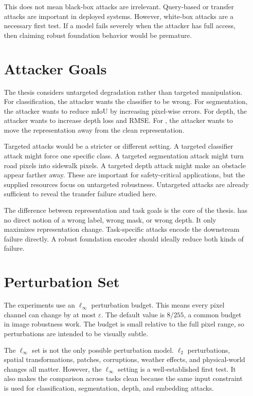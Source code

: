 This does not mean black-box attacks are irrelevant. Query-based or transfer attacks are important in deployed systems. However, white-box attacks are a necessary first test. If a model fails severely when the attacker has full access, then claiming robust foundation behavior would be premature.

\section{Attacker Goals}

The thesis considers untargeted degradation rather than targeted manipulation. For classification, the attacker wants the classifier to be wrong. For segmentation, the attacker wants to reduce mIoU by increasing pixel-wise errors. For depth, the attacker wants to increase depth loss and RMSE. For \EmbedAttack, the attacker wants to move the representation away from the clean representation.

Targeted attacks would be a stricter or different setting. A targeted classifier attack might force one specific class. A targeted segmentation attack might turn road pixels into sidewalk pixels. A targeted depth attack might make an obstacle appear farther away. These are important for safety-critical applications, but the supplied resources focus on untargeted robustness. Untargeted attacks are already sufficient to reveal the transfer failure studied here.

The difference between representation and task goals is the core of the thesis. \EmbedAttack has no direct notion of a wrong label, wrong mask, or wrong depth. It only maximizes representation change. Task-specific attacks encode the downstream failure directly. A robust foundation encoder should ideally reduce both kinds of failure.

\section{Perturbation Set}

The experiments use an $\ell_\infty$ perturbation budget. This means every pixel channel can change by at most $\varepsilon$. The default value is $8/255$, a common budget in image robustness work. The budget is small relative to the full pixel range, so perturbations are intended to be visually subtle.

The $\ell_\infty$ set is not the only possible perturbation model. $\ell_2$ perturbations, spatial transformations, patches, corruptions, weather effects, and physical-world changes all matter. However, the $\ell_\infty$ setting is a well-established first test. It also makes the comparison across tasks clean because the same input constraint is used for classification, segmentation, depth, and embedding attacks.

